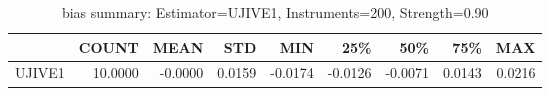 \begin{table}[ht]
\centering
\caption{bias summary: Estimator=UJIVE1, Instruments=200, Strength=0.90}
\begin{tabular}{lrrrrrrrr}
\toprule
 & COUNT & MEAN & STD & MIN & 25\% & 50\% & 75\% & MAX \\
\midrule
UJIVE1 & 10.0000 & -0.0000 & 0.0159 & -0.0174 & -0.0126 & -0.0071 & 0.0143 & 0.0216 \\
\bottomrule
\end{tabular}
\end{table}

